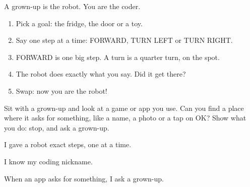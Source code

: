 
\begin{playathome}
A grown-up is the robot. You are the coder.
\begin{enumerate}[leftmargin=1.4em,itemsep=2pt]
  \item Pick a goal: the fridge, the door or a toy.
  \item Say one step at a time: FORWARD, TURN LEFT or TURN RIGHT.
  \item FORWARD is one big step. A turn is a quarter turn, on the spot.
  \item The robot does exactly what you say. Did it get there?
  \item Swap: now you are the robot!
\end{enumerate}
\end{playathome}

\begin{playathome}
Sit with a grown-up and look at a game or app you use. Can you find a place where it asks for something, like a name, a photo or a tap on OK? Show what you do: stop, and ask a grown-up.
\end{playathome}

\begin{selfcheck}
  \item I gave a robot exact steps, one at a time.
  \item I know my coding nickname.
  \item When an app asks for something, I ask a grown-up.
\end{selfcheck}
